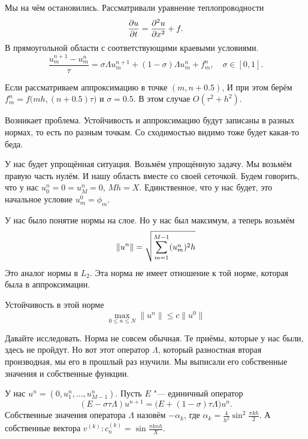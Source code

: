 Мы на чём остановились. Рассматривали уравнение теплопроводности
\[
  \frac{\partial u}{\partial t} = \frac{\partial ^2u}{\partial x^2} + f.
\]
В прямоугольной области с соответствующими краевыми условиями.
\[
  \frac{u_m^{n+1}- u_m^n}{\tau} = \sigma \Lambda u_m^{n+1} + (1-\sigma) \Lambda u_m^n + f_m^n,\quad
  \sigma\in[0,1].
\]

Если рассматриваем аппроксимацию в точке $(m,n+0.5)$, И при этом берём $f_m^n = f\big(mh,(n+0.5)\tau\big)$ и $\sigma=0.5$. В этом случае $O(\tau^2+h^2)$.

Возникает проблема. Устойчивость и аппроксимацию будут записаны в разных нормах, то есть по разным точкам. Со сходимостью видимо тоже будет какая-то беда.

У нас будет упрощённая ситуация. Возьмём упрощённую задачу. Мы возьмём правую часть нулём. И нашу область вместе со своей сеточкой. Будем говорить, что у нас $u_0^n=0=u_M^n=0$, $Mh=X$. Единственное, что у нас будет, это начальное условие $u^0_m=\phi_m$.

У нас было понятие нормы на слое. Но у нас был максимум, а теперь возьмём
\[
  \|u^n\| = \sqrt{\sum\limits_{m = 1}^{M-1}(u_m^n)^2h}
\]
Это аналог нормы в $L_2$. Эта норма не имеет отношение к той норме, которая была в аппроксимации. 
\begin{Def}
Устойчивость в этой норме
\[
  \max\limits_{0\le n\le N} \|u^n\|\le c\|u^0\|
\]
\end{Def}

Давайте исследовать. Норма не совсем обычная. Те приёмы, которые у нас были, здесь не пройдут. Но вот этот оператор $\Lambda$, который разностная вторая производная, мы его в прошлый раз изучили. Мы выписали его собственные значения и собственные функции.

У нас $u^n = (0,u_1^n,\dots,u_{M-1}^n)$. Пусть $E$ "--- единичный оператор
\begin{equation}\label{eqeq}
  (E - \sigma\tau \Lambda)u^{n+1} = \big(E + (1-\sigma)\tau\Lambda\big)u^n.
\end{equation}
Собственные значения оператора $\Lambda$ назовём $-\alpha_k$, где $\alpha_k = \frac4{h^2}\sin^2\frac{\pi k h}2$. А собственные вектора $v^{(k)}\colon c^{(k)}_n = \sin\frac{\pi k n h}{X}$.

